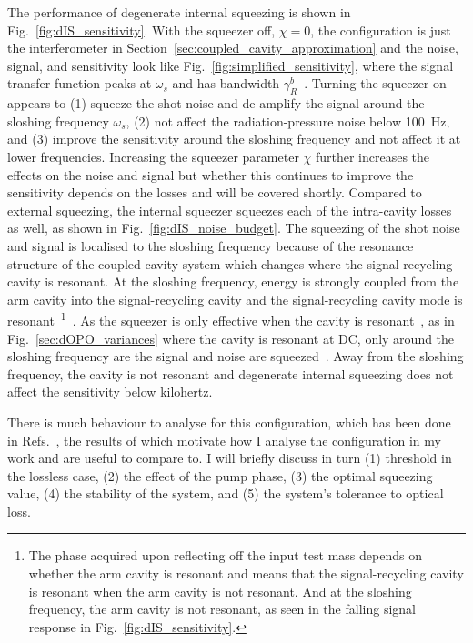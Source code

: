 The performance of degenerate internal squeezing is shown in Fig.~\ref{fig:dIS_sensitivity}. With the squeezer off, $\chi=0$, the configuration is just the interferometer in Section~\ref{sec:coupled_cavity_approximation} and the noise, signal, and sensitivity look like Fig.~\ref{fig:simplified_sensitivity}, where the signal transfer function peaks at $\omega_s$ and has bandwidth $\gamma^b_R$~\cite{}. Turning the squeezer on appears to (1) squeeze the shot noise and de-amplify the signal around the sloshing frequency $\omega_s$, (2) not affect the radiation-pressure noise below 100~Hz, and (3) improve the sensitivity around the sloshing frequency and not affect it at lower frequencies. %
Increasing the squeezer parameter $\chi$ further increases the effects on the noise and signal but whether this continues to improve the sensitivity depends on the losses and will be covered shortly. Compared to external squeezing, the internal squeezer squeezes each of the intra-cavity losses as well, as shown in Fig.~\ref{fig:dIS_noise_budget}. 
The squeezing of the shot noise and signal is localised to the sloshing frequency because of the resonance structure of the coupled cavity system which changes where the signal-recycling cavity is resonant. At the sloshing frequency, energy is strongly coupled from the arm cavity into the signal-recycling cavity and the signal-recycling cavity mode is resonant~\footnote{The phase acquired upon reflecting off the input test mass depends on whether the arm cavity is resonant and means that the signal-recycling cavity is resonant when the arm cavity is not resonant. And at the sloshing frequency, the arm cavity is not resonant, as seen in the falling signal response in Fig.~\ref{fig:dIS_sensitivity}.}~\cite{KorobkoThesis}. As the squeezer is only effective when the cavity is resonant~\cite{}, as in Fig.~\ref{sec:dOPO_variances} where the cavity is resonant at DC, only around the sloshing frequency are the signal and noise are squeezed~\cite{}.  Away from the sloshing frequency, the cavity is not resonant and degenerate internal squeezing does not affect the sensitivity below kilohertz.

There is much behaviour to analyse for this configuration, which has been done in Refs.~\cite{Korobko2019,Adya2020,KorobkoThesis?}, the results of which motivate how I analyse the configuration in my work and are useful to compare to. I will briefly discuss in turn (1) threshold in the lossless case, (2) the effect of the pump phase, (3) the optimal squeezing value, (4) the stability of the system, and (5) the system's tolerance to optical loss.

